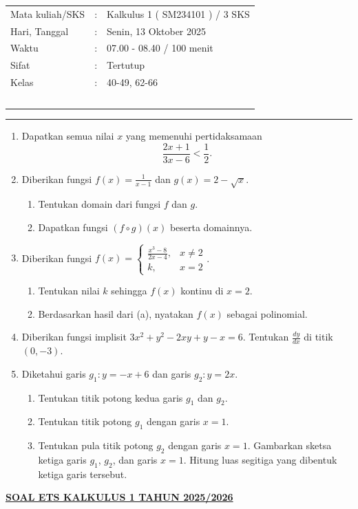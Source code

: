 \documentclass[10pt,openany,a4paper]{article}
\theoremstyle{definition}
\theoremstyle{definition}
\theoremstyle{plain}
\begin{document}
    \begin{center}
	\begin{tabular}{lcl}
		Mata kuliah/SKS & : & Kalkulus 1 ( SM234101 ) / 3 SKS\\
		Hari, Tanggal & : & Senin, 13 Oktober 2025\\
		Waktu & : & 07.00 - 08.40 / 100 menit\\
		Sifat & : & Tertutup\\
		Kelas & : & 40-49, 62-66\\
  ~
	\end{tabular}
    
    \noindent\rule{\textwidth}{2.pt}
        \end{center}
    \begin{enumerate}
     \item Dapatkan semua nilai \(x\) yang memenuhi pertidaksamaan
    \[
        \dfrac{2x + 1}{3x - 6} < \dfrac{1}{2}.
    \]

    \item Diberikan fungsi \(f(x) = \frac{1}{x-1}\) dan \(g(x) = 2 - \sqrt{x}\).
    \begin{enumerate}
        \item Tentukan domain dari fungsi \(f\) dan \(g\).
        \item Dapatkan fungsi \((f \circ g)(x)\) beserta domainnya.
    \end{enumerate}

    \item Diberikan fungsi \(f(x) = \begin{cases} \frac{x^3-8}{2x-4}, & x \neq 2 \\ k, & x=2 \end{cases}\).
    \begin{enumerate}
        \item Tentukan nilai \(k\) sehingga \(f(x)\) kontinu di \(x = 2\).
        \item Berdasarkan hasil dari (a), nyatakan \(f(x)\) sebagai polinomial.
    \end{enumerate}

    \item Diberikan fungsi implisit \(3x^2 + y^2 - 2xy + y - x = 6\). Tentukan \(\frac{dy}{dx}\) di titik \((0,-3)\).

    \item Diketahui garis \(g_1: y = -x + 6\) dan garis \(g_2: y = 2x\).
    \begin{enumerate}
        \item Tentukan titik potong kedua garis \(g_1\) dan \(g_2\).
        \item Tentukan titik potong \(g_1\) dengan garis \(x = 1\).
        \item Tentukan pula titik potong \(g_2\) dengan garis \(x = 1\). Gambarkan sketsa ketiga garis \(g_1\), \(g_2\), dan garis \(x = 1\). Hitung luas segitiga yang dibentuk ketiga garis tersebut.
    \end{enumerate}
\end{enumerate}
\newpage
 \begin{center}
	{\underline{\textbf{\MakeUppercase{Soal ETS Kalkulus 1 Tahun 2025/2026}}}}
    \end{center}
\end{document}
